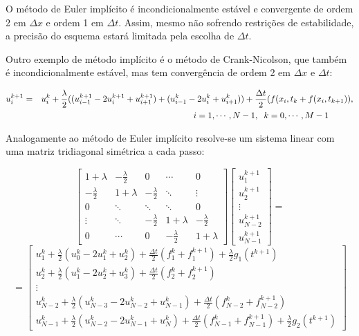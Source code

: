 \documentclass[a4paper, 12pt]{article}
\begin{document}
O método de Euler implícito é incondicionalmente estável e convergente de ordem 2 em $\Delta x$ e ordem 1 em $\Delta t$. Assim, mesmo não sofrendo restrições de estabilidade, a precisão do esquema estará limitada pela escolha de $\Delta t$.

Outro exemplo de método implícito é o método de Crank-Nicolson, que também é incondicionalmente estável, mas tem convergência de ordem 2 em $\Delta x$ e $\Delta t$:


\begin{eqnarray}
u_{i}^{k+1} & = & u_{i}^{k} + \frac{\lambda}{2} ((u_{i-1}^{k+1} -2u_{i}^{k+1} +u_{i+1}^{k+1}) + (u_{i-1}^{k} -2u_{i}^{k} +u_{i+1}^{k})) + \frac{\Delta t}{2} (f(x_i,t_{k} + f(x_i,t_{k+1})),\nonumber \\ &&\hspace{3.5cm} i=1,\cdots,N-1, \hspace{0.2cm} k=0,\cdots,M-1 \hspace{1cm}
\end{eqnarray}

Analogamente ao método de Euler implícito resolve-se um sistema linear com uma matriz tridiagonal simétrica a cada passo:

\begin{equation}
\left[\begin{array}{ccccc}
	
	1+\lambda   & -\frac{\lambda}{2}     & 0 		 & \cdots    	& 0 			\\ 
	-\frac{\lambda}{2}     & 1+\lambda   & -\frac{\lambda}{2}   &  \ddots  	&  \vdots   	\\ 
	0 			 &  \ddots  	&  \ddots    &  \ddots  	& 0 			\\ 
	 \vdots  	 &  \ddots  	& -\frac{\lambda}{2}  & 1+ \lambda  & -\frac{\lambda}{2}  	\\ 
	0 			 &  \cdots  	& 0 		 & -\frac{\lambda}{2}  	& 1+ \lambda 
	
\end{array} \right] 
\left[\begin{array}{c}
u_{1}^{k+1} 			\\ 
u_{2}^{k+1} 			\\ 
\vdots 					\\ 
u_{N-2}^{k+1} 			\\ 
u_{N-1}^{k+1}
\end{array} \right]
=
\end{equation}
$$= \left[\begin{array}{c}
u_{1}^k + \frac{\lambda}{2}(u_{0}^k -2u_{1}^k +u_{2}^k) +\frac{\Delta t}{2}(f_{1}^{k}+f_{1}^{k+1}) + \frac{\lambda}{2} g_{1}(t^{k+1}) \\ 
u_{2}^k +\frac{\lambda}{2}(u_{1}^k -2u_{2}^k +u_{3}^k) +\frac{\Delta t}{2}( f_{2}^{k}+f_{2}^{k+1}) \\ 
\vdots \\ 
u_{N-2}^k +\frac{\lambda}{2}(u_{N-3}^k -2u_{N-2}^k +u_{N-1}^k) +\frac{\Delta t}{2}( f_{N-2}^{k}+f_{N-2}^{k+1}) \\ 
u_{N-1}^k + \frac{\lambda}{2}(u_{N-2}^k -2u_{N-1}^k +u_{N}^k) + \frac{\Delta t}{2}( f_{N-1}^{k}+f_{N-1}^{k+1}) +\frac{\lambda}{2} g_{2}(t^{k+1})
\end{array} \right] 
$$
\end{document}
